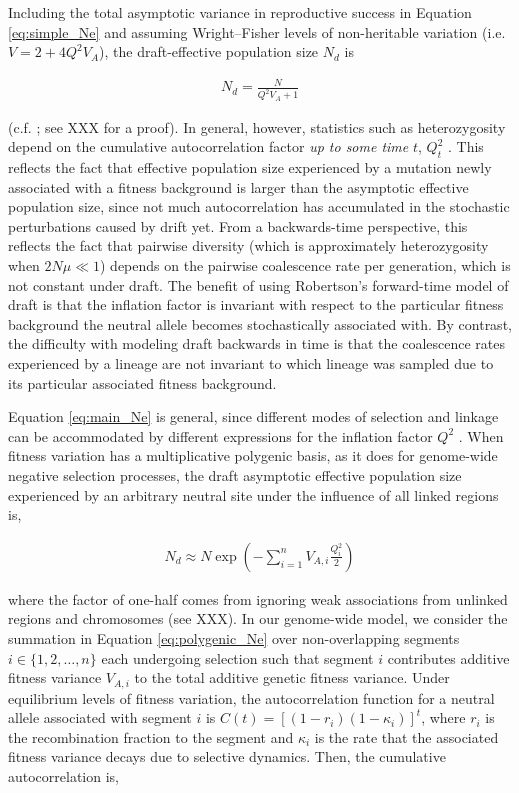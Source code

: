 \documentclass[11pt]{article}
\begin{document}
Including the total asymptotic variance in reproductive success in Equation
\eqref{eq:simple_Ne} and assuming Wright--Fisher levels of non-heritable
variation (i.e. $V = 2 + 4 Q^2 V_A$), the draft-effective population size $N_d$
is

\begin{align}
    \label{eq:main_Ne}
    N_d = \frac{N}{Q^2 V_A + 1}
\end{align}

(c.f. \cite{Robertson1961-ho,Santiago1995-hx}; see XXX for a proof). In
general, however, statistics such as heterozygosity depend on the cumulative
autocorrelation factor \emph{up to some time} $t$, $Q_t^2$ \parencite[p.
2111]{Santiago1998-bs}. This reflects the fact that effective population size
experienced by a mutation newly associated with a fitness background is larger
than the asymptotic effective population size, since not much autocorrelation
has accumulated in the stochastic perturbations caused by drift yet. From a
backwards-time perspective, this reflects the fact that pairwise diversity
(which is approximately heterozygosity when $2N\mu \ll 1$) depends on the
pairwise coalescence rate per generation, which is not constant under draft.
The benefit of using Robertson's forward-time model of draft is that the
inflation factor is invariant with respect to the particular fitness background
the neutral allele becomes stochastically associated with. By contrast, the
difficulty with modeling draft backwards in time is that the coalescence rates
experienced by a lineage are not invariant to which lineage was sampled due to
its particular associated fitness background.

Equation \eqref{eq:main_Ne} is general, since different modes of selection and
linkage can be accommodated by different expressions for the inflation factor
$Q^2$ \parencite{Santiago1995-hx,Santiago1998-bs}. When fitness variation has a
multiplicative polygenic basis, as it does for genome-wide negative selection
processes, the draft asymptotic effective population size experienced by an
arbitrary neutral site under the influence of all linked regions is,

\begin{align}
    \label{eq:polygenic_Ne}
    N_d \approx N \exp\left(-\sum_{i=1}^n V_{A,i} \frac{Q_i^2}{2}\right)
\end{align}

where the factor of one-half comes from ignoring weak associations from
unlinked regions and chromosomes (see XXX). In our genome-wide model, we
consider the summation in Equation \eqref{eq:polygenic_Ne} over non-overlapping
segments $i \in \{1, 2, \ldots, n\}$ each undergoing selection such that
segment $i$ contributes additive fitness variance $V_{A,i}$ to the total
additive genetic fitness variance. Under equilibrium levels of fitness
variation, the autocorrelation function for a neutral allele associated with
segment $i$ is $C(t) = [(1-r_i)(1-\kappa_i)]^t$, where $r_i$ is the
recombination fraction to the segment and $\kappa_i$ is the rate that the
associated fitness variance decays due to selective dynamics. Then, the
cumulative autocorrelation is,
\end{document}
